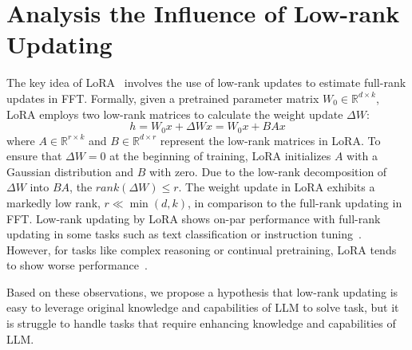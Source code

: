 \documentclass[11pt]{article}
\begin{document}
\section{Analysis the Influence of Low-rank Updating}
\label{sec:3}

The key idea of LoRA~\cite{hu2021lora} involves the use of low-rank updates to estimate full-rank updates in FFT. Formally, given a pretrained parameter matrix $ W_0 \in \mathbb{R}^{d \times k} $, LoRA employs two low-rank matrices to calculate the weight update $\Delta W$:
\begin{equation}
h = W_0x + \Delta W x= W_0x + BAx
\end{equation}
where $A \in \mathbb{R}^{r \times k}$ and $B \in \mathbb{R}^{d \times r}$ represent the low-rank matrices in LoRA. To ensure that $\Delta W=0$ at the beginning of training, LoRA initializes $A$ with a Gaussian distribution and $B$ with zero. Due to the low-rank decomposition of $\Delta W$ into $BA$, the $rank(\Delta W) \leq r$.
The weight update in LoRA exhibits a markedly low rank, $r \ll \min (d, k)$, in comparison to the full-rank updating in FFT.
Low-rank updating by LoRA shows on-par performance with full-rank updating in some tasks such as text classification or instruction tuning~\cite{liu2024dora, meng2024periodiclora}.
However, for tasks like complex reasoning or continual pretraining, LoRA tends to show worse performance~\cite{liu2023chipnemo}.

Based on these observations, we propose a hypothesis that low-rank updating is easy to leverage original knowledge and capabilities of LLM to solve task, but it is struggle to handle tasks that require enhancing knowledge and capabilities of LLM.
\end{document}
